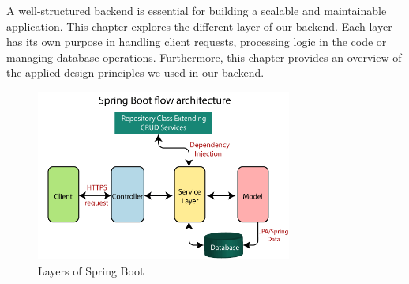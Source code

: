 \Author{\daAuthorThree}

    A well-structured backend is essential for building a scalable and maintainable application. This chapter explores the different layer of our backend. Each layer has its own purpose in handling client requests, processing logic in the code or managing database operations. Furthermore, this chapter provides an overview of the applied design principles we used in our backend.

    \begin{figure} [H]
        \centering
        \includegraphics [width=0.75\textwidth] {images/andreas/backendstructure/springBootLayers.png}
        \caption{Layers of Spring Boot}
    \end{figure}

